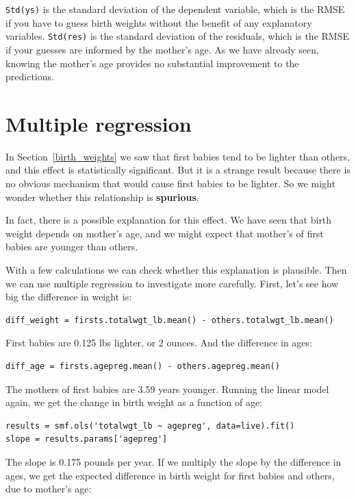 \documentclass[12pt]{book}
\begin{document}
{\tt Std(ys)} is the standard deviation of the dependent variable,
which is the RMSE if you have to guess birth weights without the benefit of
any explanatory variables.  {\tt Std(res)} is the standard deviation
of the residuals, which is the RMSE if your guesses are informed
by the mother's age.  As we have already seen, knowing the mother's
age provides no substantial improvement to the predictions.


\section{Multiple regression}
\label{multiple}

In Section~\ref{birth_weights} we saw that first babies tend to be
lighter than others, and this effect is statistically significant.
But it is a strange result because there is no obvious mechanism that
would cause first babies to be lighter.  So we might wonder whether
this relationship is {\bf spurious}.

In fact, there is a possible explanation for this effect.  We have
seen that birth weight depends on mother's age, and we might expect
that mother's of first babies are younger than others.

With a few calculations we can check whether this explanation
is plausible.  Then we can use multiple regression to investigate
more carefully.  First, let's see how big the difference in weight
is:

\begin{verbatim}
diff_weight = firsts.totalwgt_lb.mean() - others.totalwgt_lb.mean()
\end{verbatim}

First babies are 0.125 lbs lighter, or 2 ounces.  And the difference
in ages:

\begin{verbatim}
diff_age = firsts.agepreg.mean() - others.agepreg.mean()
\end{verbatim}

The mothers of first babies are 3.59 years younger.  Running the
linear model again, we get the change in birth weight as a function
of age:

\begin{verbatim}
results = smf.ols('totalwgt_lb ~ agepreg', data=live).fit()
slope = results.params['agepreg']
\end{verbatim}

The slope is 0.175 pounds per year.  If we multiply the slope by
the difference in ages, we get the expected difference in birth
weight for first babies and others, due to mother's age:
\end{document}
